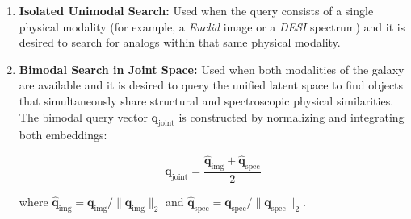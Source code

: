 \begin{enumerate}
	\item \textbf{Isolated Unimodal Search:}
	Used when the query consists of a single physical modality (for example, a \textit{Euclid} image or a \textit{\gls{DESI}} spectrum) and it is desired to search for analogs within that same physical modality.

	\item \textbf{Bimodal Search in Joint Space:}
	Used when both modalities of the galaxy are available and it is desired to query the unified latent space to find objects that simultaneously share structural and spectroscopic physical similarities. The bimodal query vector $\mathbf{q}_{\text{joint}}$ is constructed by normalizing and integrating both embeddings:

	\begin{equation}
	\mathbf{q}_{\text{joint}} = \frac{\hat{\mathbf{q}}_{\text{img}} + \hat{\mathbf{q}}_{\text{spec}}}{2}
	\label{eq:ap_q_joint}
	\end{equation}

	where $\hat{\mathbf{q}}_{\text{img}} = \mathbf{q}_{\text{img}}/\|\mathbf{q}_{\text{img}}\|_2$ and $\hat{\mathbf{q}}_{\text{spec}} = \mathbf{q}_{\text{spec}}/\|\mathbf{q}_{\text{spec}}\|_2$.


\end{enumerate}
